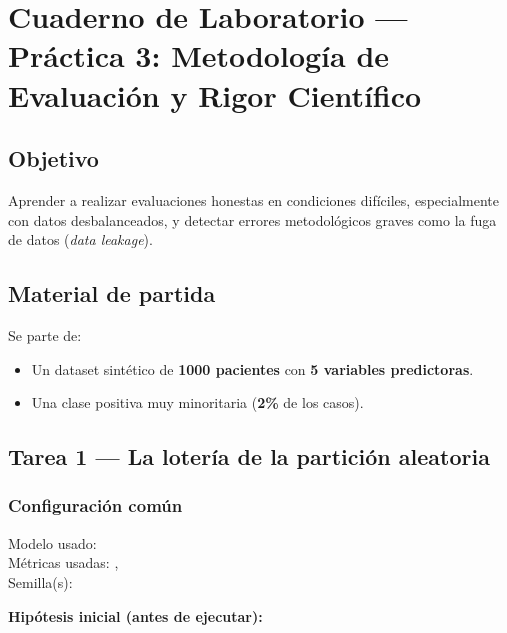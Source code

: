 \chapter{Cuaderno de Laboratorio — Práctica 3: Metodología de Evaluación y Rigor Científico}

\section*{Objetivo}
Aprender a realizar evaluaciones honestas en condiciones difíciles, especialmente con datos desbalanceados,
y detectar errores metodológicos graves como la fuga de datos (\textit{data leakage}).

\section*{Material de partida}
Se parte de:
\begin{itemize}
    \item Un dataset sintético de \textbf{1000 pacientes} con \textbf{5 variables predictoras}.
    \item Una clase positiva muy minoritaria (\textbf{2\%} de los casos).
\end{itemize}

\section{Tarea 1 — La lotería de la partición aleatoria}

\subsection*{Configuración común}
Modelo usado: \underline{\hspace{6cm}}\\
Métricas usadas: \underline{\hspace{4cm}}, \underline{\hspace{4cm}}\\
Semilla(s): \underline{\hspace{3cm}}

\vspace{0.3cm}
\noindent\textbf{Hipótesis inicial (antes de ejecutar):}
\underline{\hspace{14cm}}\\
\underline{\hspace{14cm}}
\vspace{0.3cm}

